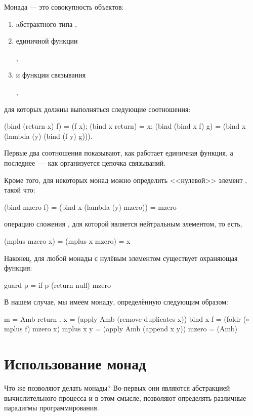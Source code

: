 Монада --- это совокупность объектов:
\begin{enumerate}
  \item aбстрактного типа ,
  \item единичной функции 
  \begin{center}
  ,
  \end{center}
  \item и функции связывания 
  \begin{center}
  ,
  \end{center}
\end{enumerate}
для которых должны выполняться следующие соотношения:
\begin{SchemeCode}
  (bind (return x) f) = (f x);
  (bind x return) = x;
  (bind (bind x f) g) = (bind x (lambda (y) (bind (f y) g))).
\end{SchemeCode}
Первые два соотношения показывают, как работает единичная функция, а последнее~--- как организуется цепочка связываний.

Кроме того, для некоторых монад можно определить <<нулевой>> элемент , такой что:

\begin{SchemeCode}
  (bind mzero f) = (bind x (lambda (y) mzero)) = mzero
\end{SchemeCode}
 операцию сложения , для которой  является нейтральным элементом, то есть,
\begin{SchemeCode}
  (mplus mzero x) = (mplus x mzero) = x
\end{SchemeCode}

Наконец, для любой монады с нулёвым элементом существует охраняющая функция:

\begin{SchemeCode}
  guard p = if p (return null) mzero
\end{SchemeCode}

В нашем случае, мы имеем монаду, определённую следующим образом:

\begin{SchemeCode}
  m          = Amb
  return . x = (apply Amb (remove-duplicates x))
  bind x f   = (foldr ($\circ$ mplus f) mzero x)
  mplus x y  = (apply Amb (append x y))
  mzero      = (Amb)
\end{SchemeCode}

\section[2]{Использование монад}%
Что же позволяют делать монады? Во-первых они являются абстракцией вычислительного процесса и в этом смысле, позволяют определять различные парадигмы программирования. 

